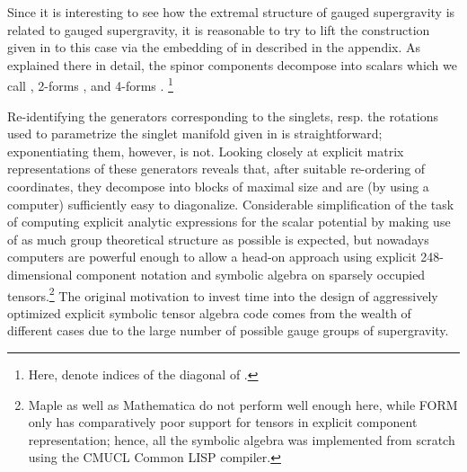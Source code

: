 \documentclass[a4paper,12pt]{article}
\begin{document}
Since it is interesting to see how the extremal structure of \coordHE{} gauged \coordHE{} supergravity is related to \coordHE{}  \coordHE{} gauged supergravity, it is reasonable to try to
lift the construction given in \cite{Warner:vz} to this case via the
embedding of \coordHE{} in \coordHE{} described in the appendix. As
explained there in detail, the \coordHE{} spinor components \coordHE{}
decompose into \coordHE{}  \coordHE{} scalars which we call \myHighlight{$\psipm{}$}\coordHE{},
\coordHE{} 2-forms \coordHE{}, and
\coordHE{} 4-forms \coordHE{}.%
\footnote{Here, \coordHE{} denote
\coordHE{} indices of the diagonal \coordHE{} of \coordHE{}.}

Re-identifying the \coordHE{} generators corresponding to the \coordHE{}
singlets, resp. the \coordHE{} rotations used to parametrize the singlet
manifold given in \cite{Warner:vz} is straightforward; exponentiating
them, however, is not. Looking closely at explicit \coordHE{}
matrix representations of these generators reveals that, after
suitable re-ordering of coordinates, they decompose into blocks of
maximal size \coordHE{} and are (by using a computer) sufficiently
easy to diagonalize.  Considerable simplification of the task of
computing explicit analytic expressions for the scalar potential by
making use of as much group theoretical structure as possible is
expected, but nowadays computers are powerful enough to allow a
head-on approach using explicit 248-dimensional component notation and
symbolic algebra on sparsely occupied tensors.\footnote{Maple as well
as Mathematica do not perform well enough here, while FORM only has
comparatively poor support for tensors in explicit component
representation; hence, all the symbolic algebra was implemented from
scratch using the CMUCL Common LISP compiler.} The original motivation
to invest time into the design of aggressively optimized explicit
symbolic tensor algebra code comes from the wealth of different cases
due to the large number of possible gauge groups of \coordHE{}
supergravity.
\end{document}
